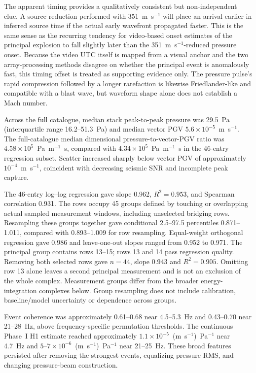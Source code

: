 \documentclass[]{seismica}
\begin{document}
The apparent timing provides a qualitatively consistent but non-independent
clue. A source reduction performed with 351~m~s$^{-1}$ will place an arrival
earlier in inferred source time if the actual early wavefront propagated
faster. This is the same sense as the recurring tendency for video-based onset
estimates of the principal explosion to fall slightly later than the
351~m~s$^{-1}$-reduced pressure onset. Because the video UTC itself is mapped
from a visual anchor and the two array-processing methods disagree on whether
the principal event is anomalously fast, this timing offset is treated as
supporting evidence only. The pressure pulse's rapid compression followed by
a longer rarefaction is likewise Friedlander-like and compatible with a blast
wave, but waveform shape alone does not establish a Mach number.

Across the full catalogue, median stack peak-to-peak pressure was 29.5~Pa
(interquartile range 16.2--51.3~Pa) and median vector PGV
$5.6\times10^{-5}$~m~s$^{-1}$. The full-catalogue median dimensional
pressure-to-vector-PGV ratio was
$4.58\times10^5$~Pa~m$^{-1}$~s, compared with
$4.34\times10^5$~Pa~m$^{-1}$~s in the 46-entry regression subset. Scatter
increased sharply below vector PGV of approximately $10^{-4}$~m~s$^{-1}$,
coincident with decreasing seismic SNR and incomplete peak capture.

The 46-entry log--log regression gave slope 0.962, $R^2=0.953$, and Spearman
correlation 0.931. The rows occupy 45 groups defined by touching or overlapping
actual sampled measurement windows, including unselected bridging rows.
Resampling these groups together gave conditional 2.5--97.5 percentiles
0.871--1.011, compared with 0.893--1.009 for row resampling. Equal-weight
orthogonal regression gave 0.986 and leave-one-out slopes ranged from 0.952
to 0.971. The principal group contains rows 13--15; rows 13 and 14 pass
regression quality. Removing both selected rows gave $n=44$, slope 0.943 and
$R^2=0.905$. Omitting row 13 alone leaves a second principal measurement and
is not an exclusion of the whole complex. Measurement groups differ from the
broader energy-integration complexes below. Group resampling does not include
calibration, baseline/model uncertainty or dependence across groups.

Event coherence was approximately 0.61--0.68 near 4.5--5.3~Hz and
0.43--0.70 near 21--28~Hz, above frequency-specific permutation thresholds.
The continuous Phase~I H1 estimate reached approximately
$1.1\times10^{-5}$~(m~s$^{-1}$)~Pa$^{-1}$ near 4.7~Hz and
$5$--$7\times10^{-6}$~(m~s$^{-1}$)~Pa$^{-1}$ near 21--25~Hz. These broad
features persisted after removing the strongest events, equalizing pressure
RMS, and changing pressure-beam construction.
\end{document}
